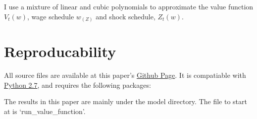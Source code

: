 \documentclass[12pt,a4paper]{scrartcl}            %
\begin{document}
I use a mixture of linear and cubic polynomials to approximate the value function $V_t(w)$, wage schedule $w_(Z)$ and shock schedule, $Z_t(w)$.


\section{Reproducability}

All source files are available at this paper's \href{https://github.com/tomAugspurger/dnwr-zlb}{Github Page}.
It is compatiable with \href{http://python.org/download/releases/2.7.5/}{Python 2.7}, and requires the following packages:


The results in this paper are mainly under the model directory.
The file to start at is `run\_value\_function'.
\end{document}

